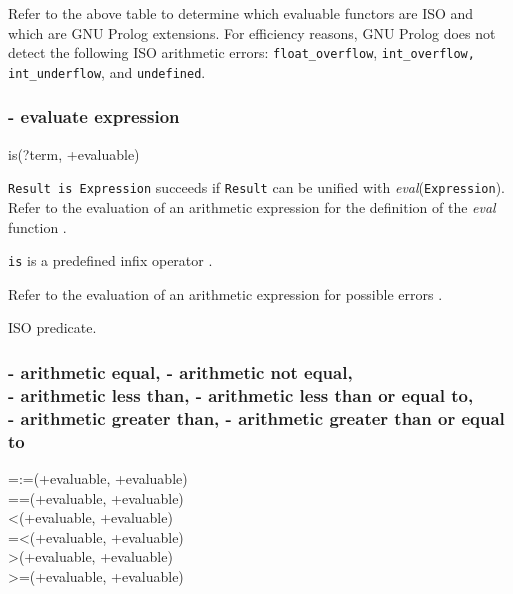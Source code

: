 \Portability

Refer to the above table to determine which evaluable functors are ISO
and which are GNU Prolog extensions. For efficiency reasons, GNU
Prolog does not detect the following ISO arithmetic errors:
\texttt{float\_overflow},
\texttt{int\_overflow, int\_underflow}, and \texttt{undefined}.

\subsubsection{ - evaluate expression}

\begin{TemplatesOneCol}
is(?term, +evaluable)

\end{TemplatesOneCol}

\Description

\texttt{Result is Expression} succeeds if \texttt{Result} can be
unified with \textit{eval}(\texttt{Expression}). Refer to the
evaluation of an arithmetic expression for the definition of the
\textit{eval} function
.

\texttt{is} is a predefined infix operator .

\Errors

Refer to the evaluation of an arithmetic expression for possible errors
.

\Portability

ISO predicate.

\subsubsection{ - arithmetic equal, \label{(=:=)/2}
                - arithmetic not equal, \\
                - arithmetic less than,
                - arithmetic less than or equal to, \\
                - arithmetic greater than,
                - arithmetic greater than or equal to}

\begin{TemplatesTwoCols}
=:=(+evaluable, +evaluable)\\
={\bs}=(+evaluable, +evaluable)\\
<(+evaluable, +evaluable)\\
=<(+evaluable, +evaluable)\\
>(+evaluable, +evaluable)\\
>=(+evaluable, +evaluable)

\end{TemplatesTwoCols}

